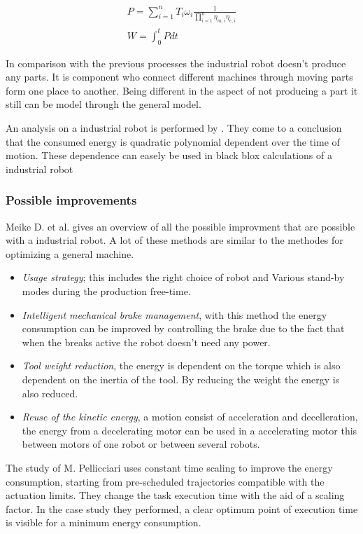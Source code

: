 \begin{equation} \label{eq:PowerIR}
\begin{split}
 P = \sum_{i=1}^{n} T_i \omega_i \frac{1}{\prod_{i=1}^{n} \eta_{m,i} \eta_{e,i}}   \\
 W  = \int_{0}^{t} P dt
\end{split}
\end{equation}

In comparison with the previous processes the industrial robot doesn't produce any parts. It is component who connect different machines through moving parts form one place to another. Being different in the aspect of not producing a part it still can be model through the general model.

An analysis on a industrial robot is performed by \cite{Chemnitz2011}. They come to a conclusion that the consumed energy is quadratic polynomial dependent over the time of motion. These dependence can easely be used in black blox calculations of a industrial robot

\subsubsection{Possible improvements}

Meike D. et al. \cite{Meike2011} gives an overview of all the possible improvment that are possible with a industrial robot. A lot of these methods are similar to the methodes for optimizing a general machine.

\begin{itemize}  
\item \textit{Usage strategy}; this includes the right choice of robot and Various stand-by modes during the production free-time.
\item \textit{Intelligent mechanical brake management}, with this method the energy consumption can be improved by controlling the brake due to the fact that when the breaks active the robot doesn't need any power.
\item \textit{Tool weight reduction}, the energy is dependent on the torque which is also dependent on the inertia of the tool. By reducing the weight the energy is also reduced.
\item \textit{Reuse of the kinetic energy}, a motion consist of acceleration and decelleration, the energy from a decelerating motor can be used in a accelerating motor this between motors of one robot or between several robots.
\end{itemize}

The study of  M. Pellicciari \cite{Pellicciari2013} uses constant time scaling to improve the energy consumption, starting from pre-scheduled trajectories compatible with the actuation limits. They change the task execution time with the aid of a scaling factor. In the case study they performed, a clear optimum point of execution time is visible for a minimum energy consumption.







